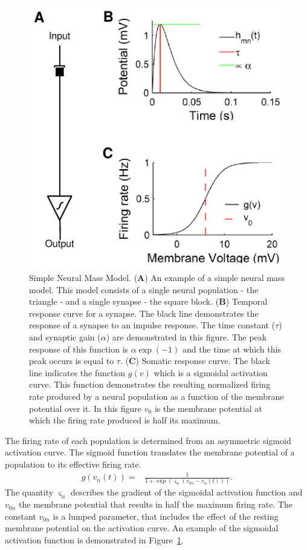 \documentclass[10pt]{article}%
\begin{document}
\begin{figure}
	\centering
		\includegraphics{Biological_Response.pdf}
	\caption{Simple Neural Mass Model. (\textbf{A}) An example of a simple neural mass model. This model consists of a single neural population - the triangle - and a single synapse - the square block. (\textbf{B}) Temporal response curve for a synapse. The black line demonstrates the response of a synapse to an impulse response. The time constant ($\tau$) and synaptic gain ($\alpha$) are demonstrated in this figure. The peak response of this function is $\alpha \exp(-1)$ and the time at which this peak occurs is equal to $\tau$. (\textbf{C}) Somatic response curve. The black line indicates the function $g(v)$ which is a sigmoidal activation curve. This function demonstrates the resulting normalized firing rate produced by a neural population as a function of the membrane potential over it. In this figure $v_{0}$ is the membrane potential at which the firing rate produced is half its maximum.}
	\label{fig: Simple}
\end{figure}

The firing rate of each population is determined from an asymmetric sigmoid activation curve. The sigmoid function translates the membrane potential of a population to its effective firing rate.
\begin{align}\label{eq:sigmoid}
    g\left(v_n(t)\right) =& \frac{1}{1+\exp{\left(\varsigma_n\left(v_{0n} - v_n(t)\right)\right)}}.
\end{align}
The quantity $\varsigma_n$ describes the gradient of the sigmoidal activation function and $v_{0n}$ the membrane potential that results in half the maximum firing rate. The constant $v_{0n}$ is a lumped parameter, that includes the effect of the resting membrane potential on the activation curve. An example of the sigmoidal activation function is demonstrated in Figure~\ref{fig: Simple}.
\end{document}
